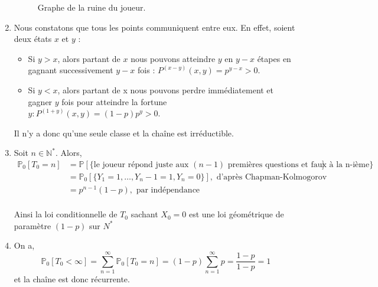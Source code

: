 \begin{enumerate}
\begin{figure}[h!]
    \caption{Graphe de la ruine du joueur.}
\end{figure}

    \item Nous constatons que tous les points communiquent entre eux. En effet, soient deux états $x$ et $y$ :
    \begin{itemize}
        \item Si $y > x$, alors partant de $x$ nous pouvons atteindre $y$ en $y - x$ étapes en gagnant successivement $y - x$ fois : $P^{(x - y)}(x, y) = p^{y - x} > 0$.

        \item Si $y<x$, alors partant de x nous pouvons perdre immédiatement et gagner $y$ fois pour atteindre la fortune $y: P^{(1+y)}(x, y) = (1-p)p^y > 0$.
    \end{itemize}
Il n’y a donc qu’une seule classe et la chaîne est irréductible.\\
\item Soit $n \in \mathbb{N}^*$. Alors,\\

\begin{align*}
    \mathbb{P}_0[T_0=n] &= \mathbb{P}[\{\text{le joueur répond juste aux $(n-1)$ premières questions et faux à la n-ième\}}] \\
    &= \mathbb{P}_0[\{Y_1 = 1, \dots, Y_n-1 = 1, Y_n = 0\}], \text{ d'après Chapman-Kolmogorov} \\
    &= p^{n-1}(1-p), \text{ par indépendance} \\ 
\end{align*}


Ainsi la loi conditionnelle de $T_0$ sachant ${X_0 = 0}$ est une loi géométrique de paramètre $(1-p)$ sur $N^*$

\item On a, 
$$
\mathbb{P}_0[T_0 < \infty] = \sum^{\infty}_{n=1}\mathbb{P}_0[T_0=n] = (1-p)\sum^{\infty}_{n=1}p = \frac{1-p}{1-p} = 1
$$
et la chaîne est donc récurrente.
\end{enumerate}


